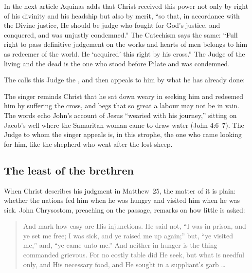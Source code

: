 In the next article Aquinas adds that Christ received this power not only by right of his divinity and his headship but also by merit, ``so that, in accordance with the Divine justice, He should be judge who fought for God's justice, and conquered, and was unjustly condemned.'' The Catechism says the same: ``Full right to pass definitive judgement on the works and hearts of men belongs to him as redeemer of the world. He `acquired' this right by his cross.'' The Judge of the living and the dead is the one who stood before Pilate and was condemned.

The  calls this Judge the , and then appeals to him by what he has already done:

\begin{quote}
\end{quote}

\noindent The singer reminds Christ that he sat down weary in seeking him and redeemed him by suffering the cross, and begs that so great a labour may not be in vain. The words echo John's account of Jesus ``wearied with his journey,'' sitting on Jacob's well where the Samaritan woman came to draw water (John 4:6--7). The Judge to whom the singer appeals is, in this strophe, the one who came looking for him, like the shepherd who went after the lost sheep.

\subsection{The least of the brethren}

When Christ describes his judgment in Matthew~25, the matter of it is plain: whether the nations fed him when he was hungry and visited him when he was sick. John Chrysostom, preaching on the passage, remarks on how little is asked:

\begin{quote}
And mark how easy are His injunctions. He said not, ``I was in prison, and ye set me free; I was sick, and ye raised me up again;'' but, ``ye visited me,'' and, ``ye came unto me.'' And neither in hunger is the thing commanded grievous. For no costly table did He seek, but what is needful only, and His necessary food, and He sought in a suppliant's garb \ldots{}
\end{quote}

